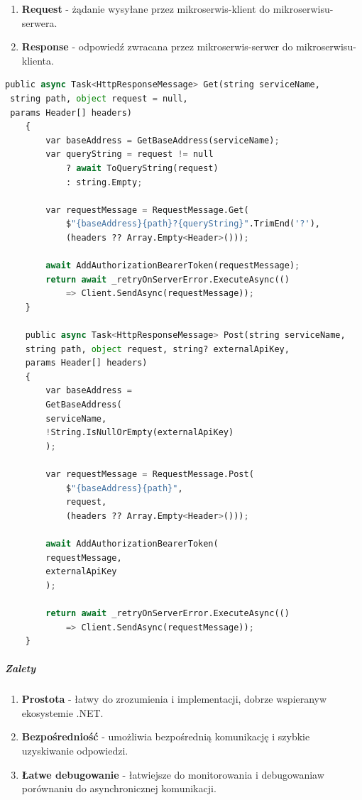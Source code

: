 \begin{enumerate}
\item {\bf Request} - żądanie wysyłane przez mikroserwis-klient do mikroserwisu-serwera.
\item {\bf Response} - odpowiedź zwracana przez mikroserwis-serwer do mikroserwisu-klienta.
\end{enumerate}
\begin{lstlisting}[language=Python, caption=Funkcje POST i GET klienta HTTP, linewidth=160mm]
 public async Task<HttpResponseMessage> Get(string serviceName, 
 string path, object request = null, 
 params Header[] headers)
    {
        var baseAddress = GetBaseAddress(serviceName);
        var queryString = request != null
            ? await ToQueryString(request)
            : string.Empty;

        var requestMessage = RequestMessage.Get(
            $"{baseAddress}{path}?{queryString}".TrimEnd('?'),
            (headers ?? Array.Empty<Header>()));

        await AddAuthorizationBearerToken(requestMessage);
        return await _retryOnServerError.ExecuteAsync(() 
            => Client.SendAsync(requestMessage));
    }

    public async Task<HttpResponseMessage> Post(string serviceName, 
    string path, object request, string? externalApiKey, 
    params Header[] headers)
    {
        var baseAddress = 
        GetBaseAddress(
        serviceName, 
        !String.IsNullOrEmpty(externalApiKey)
        );
    
        var requestMessage = RequestMessage.Post(
            $"{baseAddress}{path}",
            request,
            (headers ?? Array.Empty<Header>()));
        
        await AddAuthorizationBearerToken(
        requestMessage, 
        externalApiKey
        );

        return await _retryOnServerError.ExecuteAsync(() 
            => Client.SendAsync(requestMessage));
    }
\end{lstlisting}
\subparagraph{Zalety}
\begin{enumerate}
\item {\bf Prostota} - łatwy do zrozumienia i implementacji, dobrze wspierany\linebreak w ekosystemie .NET.
\item {\bf Bezpośredniość} - umożliwia bezpośrednią komunikację i szybkie uzyskiwanie odpowiedzi.
\item {\bf Łatwe debugowanie} - łatwiejsze do monitorowania i debugowania\linebreak w porównaniu do asynchronicznej komunikacji.
\end{enumerate}

